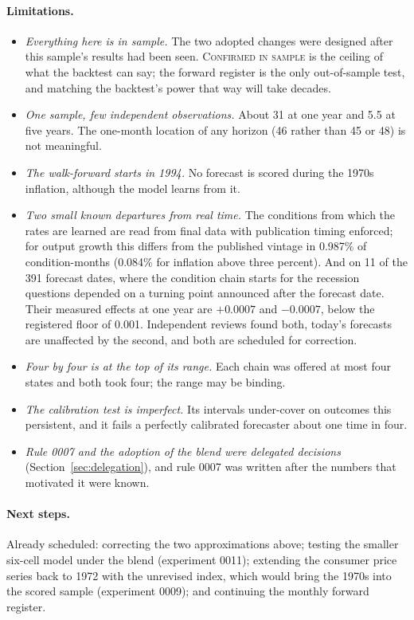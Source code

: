 \documentclass[11pt]{article}
\begin{document}
\paragraph{Limitations.}
\begin{itemize}[leftmargin=*]
\item \emph{Everything here is in sample.} The two adopted changes were designed after this sample's
  results had been seen. \textsc{Confirmed in sample} is the ceiling of what the backtest can say; the
  forward register is the only out-of-sample test, and matching the backtest's power that way will take
  decades.
\item \emph{One sample, few independent observations.} About 31 at one year and 5.5 at five years. The
  one-month location of any horizon (46 rather than 45 or 48) is not meaningful.
\item \emph{The walk-forward starts in 1994.} No forecast is scored during the 1970s inflation, although
  the model learns from it.
\item \emph{Two small known departures from real time.} The conditions from which the rates are learned are read from final
  data with publication timing enforced; for output growth this differs from the published vintage in
  0.987\% of condition-months (0.084\% for inflation above three percent). And on 11 of the 391
  forecast dates, where the condition chain starts for the recession questions depended on a turning
  point announced after the forecast date. Their measured effects at one year are $+0.0007$ and
  $-0.0007$, below the registered floor of 0.001. Independent reviews found both, today's forecasts are
  unaffected by the second, and both are scheduled for correction.
\item \emph{Four by four is at the top of its range.} Each chain was offered at most four states and both
  took four; the range may be binding.
\item \emph{The calibration test is imperfect.} Its intervals under-cover on outcomes this persistent,
  and it fails a perfectly calibrated forecaster about one time in four.
\item \emph{Rule 0007 and the adoption of the blend were delegated decisions}
  (Section~\ref{sec:delegation}), and rule 0007 was written after the numbers that motivated it were
  known.
\end{itemize}

\paragraph{Next steps.} Already scheduled: correcting the two approximations above; testing the smaller
six-cell model under the blend (experiment 0011); extending the consumer price series back to 1972 with
the unrevised index, which would bring the 1970s into the scored sample (experiment 0009); and continuing
the monthly forward register.
\end{document}
